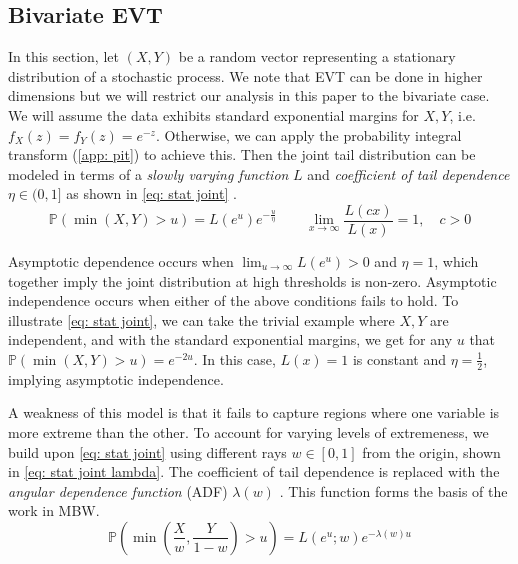 \documentclass[12pt]{article}
\begin{document}
  \subsection{Bivariate EVT}
  In this section, let $(X, Y)$ be a random vector representing a stationary distribution of a stochastic process. 
  We note that EVT can be done in higher dimensions but we will restrict our analysis in this paper to the bivariate case.
  We will assume the data exhibits standard exponential margins for $X, Y$, i.e. $f_X(z) = f_Y(z) = e^{-z}$. 
  Otherwise, we can apply the probability integral transform (\cref{app: pit}) to achieve this. Then 
  the joint tail distribution can be modeled in terms of a \textit{slowly varying function} $L$ and \textit{coefficient of tail dependence} $\eta \in (0, 1]$ as shown in \cref{eq: stat joint} \citep{LedfordTawn1996}.
  \begin{equation} \label{eq: stat joint}
    \mathbb{P}(\min(X, Y) > u) =  L(e^u)e^{-\frac{u}{\eta}} \qquad \lim_{x \to \infty} \frac{L(cx)}{L(x)} = 1, \quad c > 0
  \end{equation}

  Asymptotic dependence occurs when $\lim_{u \to \infty} L(e^u) > 0$ and $\eta = 1$, which together imply the joint distribution at high thresholds is non-zero. 
  Asymptotic independence occurs when either of the above conditions fails to hold.
  To illustrate \cref{eq: stat joint}, we can take the trivial example where $X, Y$ are independent, and with the standard exponential margins, we get for any $u$ that $\mathbb{P}(\min(X, Y) > u) = e^{-2u}$. 
  In this case, $L(x) = 1$ is constant and $\eta = \frac{1}{2}$, implying asymptotic independence.
  
  A weakness of this model is that it fails to capture regions where one variable is more extreme than the other. 
  To account for varying levels of extremeness, we build upon \cref{eq: stat joint} using different rays $w \in [0, 1]$ from the origin, shown in \cref{eq: stat joint lambda}. 
  The coefficient of tail dependence is replaced with the \textit{angular dependence function} (ADF) $\lambda(w)$ \citep{TawnWadsworth2013}. 
  This function forms the basis of the work in MBW.
  \begin{equation} \label{eq: stat joint lambda}
    \mathbb{P}\left(\min\left(\frac{X}{w}, \frac{Y}{1 - w} \right) > u \right) = L(e^u; w)e^{-\lambda(w) u}
  \end{equation}
\end{document}
